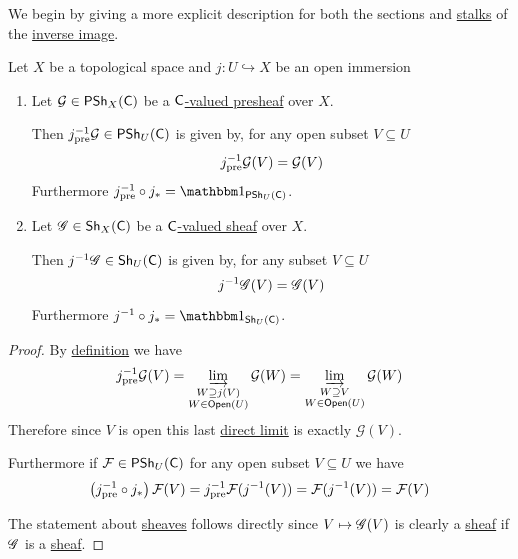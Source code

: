\documentclass[../../main]{subfiles}
\begin{document}
We begin by giving a more explicit description for both the sections and \hyperref[def:stalk]{stalks} of the \hyperref[def:inverse-image-sheaf]{inverse image}.
\begin{lemma}\label{lemma:inverse-image-open-map}
  Let \(X\) be a topological space and \(j\colon U \hookrightarrow X\) be an open immersion
  \begin{enumerate}
    \item Let \(\mathcal{G} \in \mathsf{PSh}_{X}(\mathsf{C})\) be a \hyperref[def:presheaf]{\(\mathsf{C}\)-valued presheaf} over \(X\).

          Then \(j_{\operatorname*{pre}}^{-1}\mathcal{G} \in \mathsf{PSh}_{U}(\mathsf{C})\) is given by, for any open subset \(V \subseteq U\)
          \begin{equation*}
            j_{\operatorname*{pre}}^{-1}\mathcal{G}(V) = \mathcal{G}(V)
          \end{equation*}
          Furthermore \(j_{\pre}^{-1} \circ j_{\ast} = \id_{\PSh_{U}(\category{C})}\).
    \item Let \(\mathscr{G} \in \mathsf{Sh}_{X}(\mathsf{C})\) be a \hyperref[def:sheaf]{\(\mathsf{C}\)-valued sheaf} over \(X\).

          Then \(j^{-1}\mathscr{G} \in \mathsf{Sh}_{U}(\mathsf{C})\) is given by, for any subset \(V \subseteq U\)
          \begin{equation*}
            j^{-1}\mathscr{G}(V) = \mathscr{G}(V)
          \end{equation*}
          Furthermore \(j^{-1} \circ j_{\ast} = \id_{\Sh_{U}(\category{C})}\).
  \end{enumerate}
\end{lemma}
\begin{proof}
  By \hyperref[def:inverse-image-presheaf]{definition} we have
  \begin{equation*}
    j_{\operatorname*{pre}}^{-1}\mathcal{G}(V) = \varinjlim_{\substack{W \supseteq j(V) \\ W \in \mathsf{Open}(U)}} \mathcal{G}(W) =  \varinjlim_{\substack{W \supseteq V \\ W \in \mathsf{Open}(U)}} \mathcal{G}(W)
  \end{equation*}
  Therefore since \(V\) is open this last \hyperref[def:direct-limit]{direct limit} is exactly \(\mathcal{G}(V)\).

  Furthermore if \(\mathcal{F} \in \mathsf{PSh}_{U}(\mathsf{C})\) for any open subset \(V \subseteq U\) we have
  \begin{align*}
    \left( j_{\operatorname*{pre}}^{-1} \circ j_{\ast} \right)\mathcal{F}(V) = j_{\operatorname*{pre}}^{-1} \mathcal{F}(j^{-1}(V)) = \mathcal{F}(j^{-1}(V)) = \mathcal{F}(V)
  \end{align*}

  The statement about \hyperref[def:sheaf]{sheaves} follows directly since \(V \mapsto \mathscr{G}(V)\) is clearly a \hyperref[def:sheaf]{sheaf} if \(\mathscr{G}\) is a \hyperref[def:sheaf]{sheaf}.
\end{proof}
\end{document}
